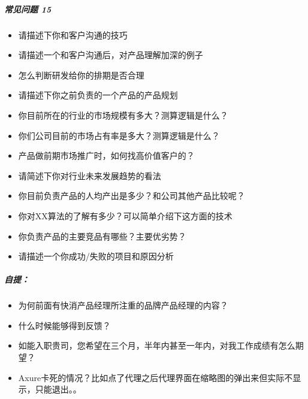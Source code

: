 \documentclass[letterpaper,10pt,english]{sphinxmanual}
\begin{document}
\subparagraph{常见问题 15\sphinxfootnotemark[871]}
\label{\detokenize{chapter_interview/question:id17}}%
\begin{footnotetext}[871]\sphinxAtStartFootnote
{}
%
\end{footnotetext}\ignorespaces \begin{itemize}
\item {} 
请描述下你和客户沟通的技巧

\item {} 
请描述一个和客户沟通后，对产品理解加深的例子

\item {} 
怎么判断研发给你的排期是否合理

\item {} 
请描述下你之前负责的一个产品的产品规划

\item {} 
你目前所在的行业的市场规模有多大？测算逻辑是什么？

\item {} 
你们公司目前的市场占有率是多大？测算逻辑是什么？

\item {} 
产品做前期市场推广时，如何找高价值客户的？

\item {} 
请简述下你对行业未来发展趋势的看法

\item {} 
你目前负责产品的人均产出是多少？和公司其他产品比较呢？

\item {} 
你对XX算法的了解有多少？可以简单介绍下这方面的技术

\item {} 
你负责产品的主要竞品有哪些？主要优劣势？

\item {} 
请描述一个你成功/失败的项目和原因分析

\end{itemize}


\subparagraph{自提：}
\label{\detokenize{chapter_interview/question:id18}}\begin{itemize}
\item {} 
为何前面有快消产品经理所注重的品牌产品经理的内容？

\item {} 
什么时候能够得到反馈？

\item {} 
如能入职贵司，您希望在三个月，半年内甚至一年内，对我工作成绩有怎么期望？
%
\begin{footnote}[872]\sphinxAtStartFootnote
{}
%
\end{footnote}

\item {} 
Axure卡死的情况？比如点了代理之后代理界面在缩略图的弹出来但实际不显示，只能退出。。

\end{itemize}
\end{document}
